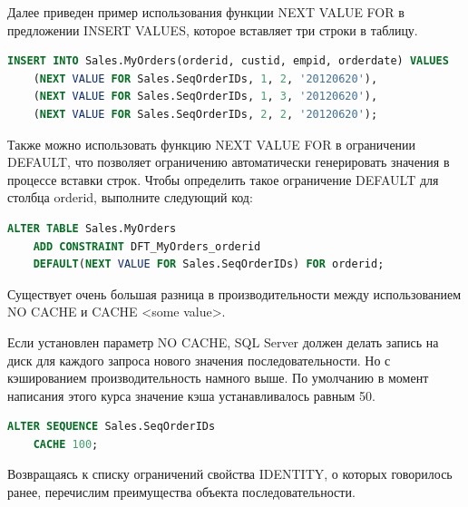 Далее приведен пример использования функции NEXT VALUE FOR в предложении
INSERT VALUES, которое вставляет три строки в таблицу. 

\begin{lstlisting}[label=lst:funcReturn, language=sql]
	INSERT INTO Sales.MyOrders(orderid, custid, empid, orderdate) VALUES
	(NEXT VALUE FOR Sales.SeqOrderIDs, 1, 2, '20120620'),
	(NEXT VALUE FOR Sales.SeqOrderIDs, 1, 3, '20120620'),
	(NEXT VALUE FOR Sales.SeqOrderIDs, 2, 2, '20120620'); 
\end{lstlisting}


Также можно использовать функцию NEXT VALUE FOR в ограничении DEFAULT, что
позволяет ограничению автоматически генерировать значения в процессе вставки
строк. Чтобы определить такое ограничение DEFAULT для столбца orderid, выполните следующий код:

\begin{lstlisting}[label=lst:funcReturn, language=sql]
	ALTER TABLE Sales.MyOrders
	ADD CONSTRAINT DFT_MyOrders_orderid
	DEFAULT(NEXT VALUE FOR Sales.SeqOrderIDs) FOR orderid;
\end{lstlisting}

Существует очень большая разница в производительности между использованием
NO CACHE и CACHE <some value>.

Если установлен параметр NO CACHE, SQL Server должен делать запись на диск для каждого запроса нового значения последовательности. Но с кэшированием производительность намного выше. По умолчанию в момент написания этого курса значение кэша устанавливалось равным 50.

\begin{lstlisting}[label=lst:funcReturn, language=sql]
	ALTER SEQUENCE Sales.SeqOrderIDs
	CACHE 100; 
\end{lstlisting}

Возвращаясь к списку ограничений свойства IDENTITY, о которых говорилось ранее,
перечислим преимущества объекта последовательности. 

